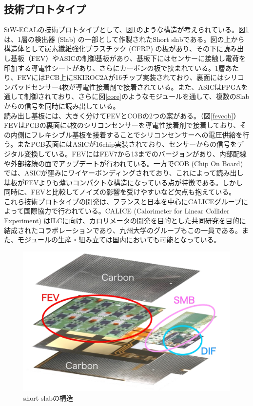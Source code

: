 \subsection{技術プロトタイプ}
SiW-ECALの技術プロトタイプとして、図\ref{shortslab}のような構造が考えられている。図\ref{shortslab}は、1層の検出器 (Slab) の一部として作製されたShort slabである。図の上から構造体として炭素繊維強化プラスチック (CFRP) の板があり、その下に読み出し基板（FEV）やASICの制御基板があり、基板下にはセンサーに接触し電荷を印加する導電性シートがあり、さらにカーボンの板で挟まれている。1層あたり、FEVにはPCB上にSKIROC2Aが16チップ実装されており、裏面にはシリコンパッドセンサー4枚が導電性接着剤で接着されている。また、ASICはFPGAを通して制御されており、さらに図\ref{core}のようなモジュールを通して、複数のSlabからの信号を同時に読み出している。\\
読み出し基板には、大きく分けてFEVとCOBの2つの案がある。（図\ref{fevcob}）FEVはPCBの裏面に4枚のシリコンセンサーを導電性接着剤で接着しており、その内側にフレキシブル基板を接着することでシリコンセンサーへの電圧供給を行う。またPCB表面にはASICが16chip実装されており、センサーからの信号をデジタル変換している。FEVにはFEV7から13までのバージョンがあり、内部配線や外部接続の面でアップデートが行われている。一方でCOB (Chip On Board) では、ASICが窪みにワイヤーボンディングされており、これによって読み出し基板がFEVよりも薄いコンパクトな構造になっている点が特徴である。しかし同時に、FEVと比較してノイズの影響を受けやすいなど欠点も抱えている。\\
これら技術プロトタイプの開発は、フランスと日本を中心にCALICEグループによって国際協力で行われている。CALICE (Calorimeter for Linear Collider Experiment) はILCに向け、カロリメータの開発を目的とした共同研究を目的に結成されたコラボレーションであり、九州大学のグループもこの一員である。また、モジュールの生産・組み立ては国内においても可能となっている。
\begin{figure}[h]
	\begin{center}
	\includegraphics[keepaspectratio, scale=0.7]
 	{Figure/Siwecal/shortslab.png}
 		\caption{short slabの構造}
 		\label{shortslab}
	\end{center}
 \end{figure}
